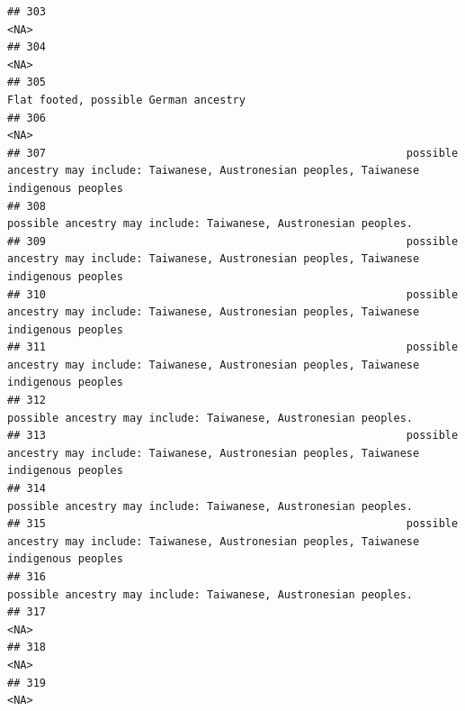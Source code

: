 \documentclass[]{article}
\begin{document}
\begin{verbatim}
## 303                                                                                                                                                <NA>
## 304                                                                                                                                                <NA>
## 305                                                                                                               Flat footed, possible German ancestry
## 306                                                                                                                                                <NA>
## 307                                                        possible ancestry may include: Taiwanese, Austronesian peoples, Taiwanese indigenous peoples
## 308                                                                                     possible ancestry may include: Taiwanese, Austronesian peoples.
## 309                                                        possible ancestry may include: Taiwanese, Austronesian peoples, Taiwanese indigenous peoples
## 310                                                        possible ancestry may include: Taiwanese, Austronesian peoples, Taiwanese indigenous peoples
## 311                                                        possible ancestry may include: Taiwanese, Austronesian peoples, Taiwanese indigenous peoples
## 312                                                                                     possible ancestry may include: Taiwanese, Austronesian peoples.
## 313                                                        possible ancestry may include: Taiwanese, Austronesian peoples, Taiwanese indigenous peoples
## 314                                                                                     possible ancestry may include: Taiwanese, Austronesian peoples.
## 315                                                        possible ancestry may include: Taiwanese, Austronesian peoples, Taiwanese indigenous peoples
## 316                                                                                     possible ancestry may include: Taiwanese, Austronesian peoples.
## 317                                                                                                                                                <NA>
## 318                                                                                                                                                <NA>
## 319                                                                                                                                                <NA>

\end{verbatim}
\end{document}
